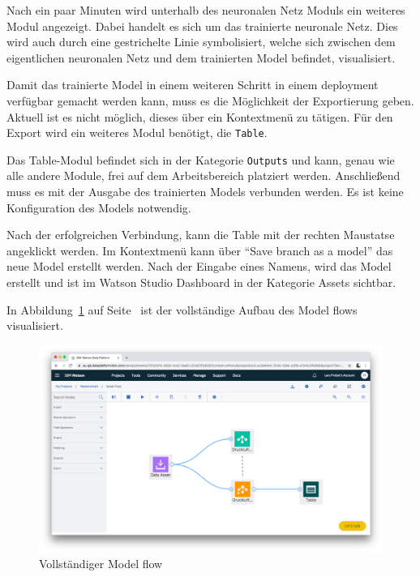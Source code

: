 Nach ein paar Minuten wird unterhalb des neuronalen Netz Moduls ein weiteres Modul angezeigt. Dabei handelt es sich um
das trainierte neuronale Netz. Dies wird auch durch eine gestrichelte Linie symbolisiert, welche sich zwischen dem
eigentlichen neuronalen Netz und dem trainierten Model befindet, visualisiert.

Damit das trainierte Model in einem weiteren Schritt in einem deployment verfügbar gemacht werden kann, muss es die
Möglichkeit der Exportierung geben. Aktuell ist es nicht möglich, dieses über ein Kontextmenü zu tätigen. Für den Export
wird ein weiteres Modul benötigt, die \texttt{Table}.

Das Table-Modul befindet sich in der Kategorie \texttt{Outputs} und kann, genau wie alle andere Module, frei auf dem
Arbeitsbereich platziert werden. Anschließend muss es mit der Ausgabe des trainierten Models verbunden werden. Es ist
keine Konfiguration des Models notwendig.

Nach der erfolgreichen Verbindung, kann die Table mit der rechten Maustatse angeklickt werden. Im Kontextmenü kann über
\enquote{Save branch as a model} das neue Model erstellt werden. Nach der Eingabe eines Namens, wird das Model erstellt
und ist im Watson Studio Dashboard in der Kategorie Assets sichtbar.

In Abbildung~\ref{fig:umsetzung_model_flow} auf Seite~\pageref{fig:umsetzung_model_flow} ist der vollständige Aufbau des
Model flows visualisiert.

\begin{figure}[h]
    \centering
    \includegraphics[scale=0.26]{images/kapitel_3/umsetzung_model_flow.png}
    \caption{Vollständiger Model flow}
    \label{fig:umsetzung_model_flow}
\end{figure}

